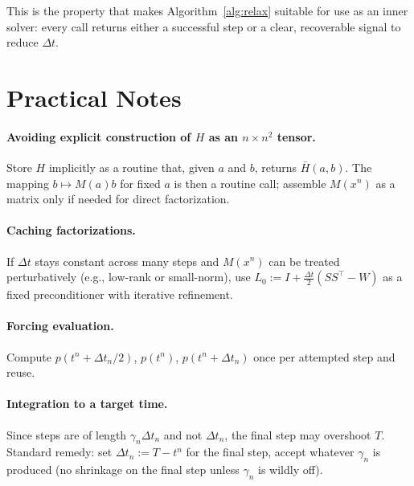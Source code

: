 \documentclass[11pt]{article}
\theoremstyle{definition}
\newcommand{\dt}{\Delta t}
\begin{document}
This is the property that makes Algorithm~\ref{alg:relax} suitable for use as an inner solver: every call returns either a successful step or a clear, recoverable signal to reduce $\dt$.

\section{Practical Notes}

\paragraph{Avoiding explicit construction of $H$ as an $n \times n^2$ tensor.}
Store $H$ implicitly as a routine that, given $a$ and $b$, returns $\bar H(a, b)$. The mapping $b \mapsto M(a) b$ for fixed $a$ is then a routine call; assemble $M(x^n)$ as a matrix only if needed for direct factorization.

\paragraph{Caching factorizations.}
If $\dt$ stays constant across many steps and $M(x^n)$ can be treated perturbatively (e.g., low-rank or small-norm), use $L_0 := I + \tfrac{\dt}{2}(SS^\top - W)$ as a fixed preconditioner with iterative refinement.

\paragraph{Forcing evaluation.}
Compute $p(t^n + \dt_n / 2)$, $p(t^n)$, $p(t^n + \dt_n)$ once per attempted step and reuse.

\paragraph{Integration to a target time.}
Since steps are of length $\gamma_n \dt_n$ and not $\dt_n$, the final step may overshoot $T$. Standard remedy: set $\dt_n := T - t^n$ for the final step, accept whatever $\gamma_n$ is produced (no shrinkage on the final step unless $\gamma_n$ is wildly off).
\end{document}
